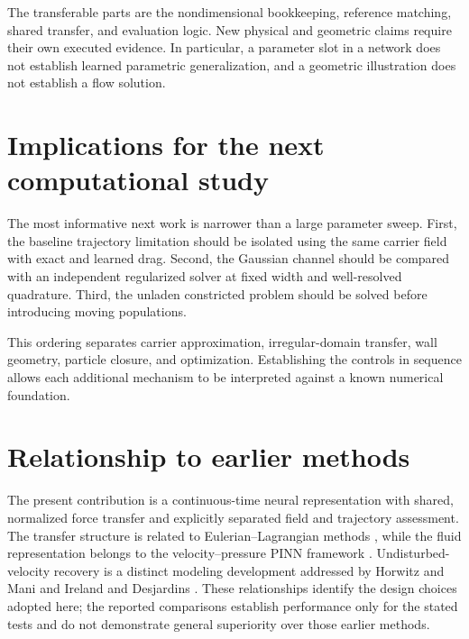 The transferable parts are the nondimensional bookkeeping, reference
matching, shared transfer, and evaluation logic. New physical and geometric
claims require their own executed evidence. In particular, a parameter
slot in a network does not establish learned parametric generalization,
and a geometric illustration does not establish a flow solution.

\section{Implications for the next computational study}
The most informative next work is narrower than a large parameter sweep.
First, the baseline trajectory limitation should be isolated using the
same carrier field with exact and learned drag. Second, the Gaussian
channel should be compared with an independent regularized solver at fixed
width and well-resolved quadrature. Third, the unladen constricted problem
should be solved before introducing moving populations.

This ordering separates carrier approximation, irregular-domain transfer,
wall geometry, particle closure, and optimization. Establishing the controls
in sequence allows each additional mechanism to be interpreted against a
known numerical foundation.

\section{Relationship to earlier methods}
The present contribution is a continuous-time neural representation with
shared, normalized force transfer and explicitly separated field and
trajectory assessment. The transfer structure is related to
Eulerian--Lagrangian methods \citep{peskin2002,capecelatro2013}, while the
fluid representation belongs to the velocity--pressure PINN framework
\citep{jin2021}. Undisturbed-velocity recovery is a distinct modeling
development addressed by Horwitz and Mani \citep{horwitz2016} and Ireland
and Desjardins \citep{ireland2017}. These
relationships identify the design choices adopted here; the reported
comparisons establish performance only for the stated tests and do not
demonstrate general superiority over those earlier methods.
